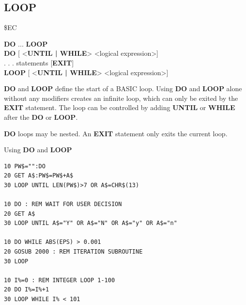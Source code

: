 \subsection{LOOP}
\begin{description}[leftmargin=2cm,style=nextline]
\item [Token:] \$EC
\item [Format:] {\bf DO} ... {\bf LOOP} \\
                {\bf DO} [ <{\bf UNTIL | WHILE}> <logical expression>] \\
                . . . statements [{\bf EXIT}] \\
                {\bf LOOP} [ <{\bf UNTIL | WHILE}> <logical expression>]
\item [Usage:] {\bf DO} and {\bf LOOP} define
                the start of a BASIC loop.
                Using {\bf DO} and {\bf LOOP} alone without any
                modifiers creates an infinite loop, which can only be exited
                by the {\bf EXIT} statement. The loop can be
                controlled by adding {\bf UNTIL} or {\bf WHILE}
                after the {\bf DO} or {\bf LOOP}.


\item [Remarks:] {\bf DO} loops may be nested. An {\bf EXIT} statement
only exits the current loop.
\item [Examples:] Using {\bf DO} and {\bf LOOP}
\begin{tcolorbox}[colback=black,coltext=white]
\verbatimfont{\codefont}
\begin{verbatim}
10 PW$="":DO
20 GET A$:PW$=PW$+A$
30 LOOP UNTIL LEN(PW$)>7 OR A$=CHR$(13)

10 DO : REM WAIT FOR USER DECISION
20 GET A$
30 LOOP UNTIL A$="Y" OR A$="N" OR A$="y" OR A$="n"

10 DO WHILE ABS(EPS) > 0.001
20 GOSUB 2000 : REM ITERATION SUBROUTINE
30 LOOP

10 I%=0 : REM INTEGER LOOP 1-100
20 DO I%=I%+1
30 LOOP WHILE I% < 101
\end{verbatim}
\end{tcolorbox}
\end{description}


\newpage

